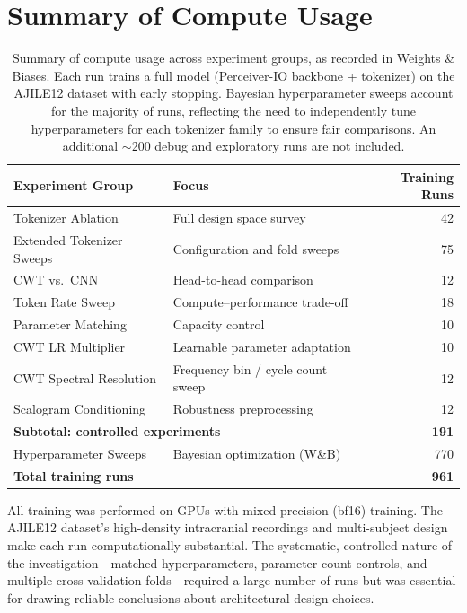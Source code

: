 \documentclass[11pt, a4paper]{article}
\begin{document}
\section{Summary of Compute Usage}
\label{sec:compute}

\begin{table}[H]
    \centering
    \begin{tabular}{llr}
        \toprule
        \textbf{Experiment Group} & \textbf{Focus} & \textbf{Training Runs} \\
        \midrule
        Tokenizer Ablation        & Full design space survey           & 42 \\
        Extended Tokenizer Sweeps & Configuration and fold sweeps      & 75 \\
        CWT vs.\ CNN              & Head-to-head comparison            & 12 \\
        Token Rate Sweep          & Compute--performance trade-off     & 18 \\
        Parameter Matching        & Capacity control                   & 10 \\
        CWT LR Multiplier         & Learnable parameter adaptation     & 10 \\
        CWT Spectral Resolution   & Frequency bin / cycle count sweep  & 12 \\
        Scalogram Conditioning    & Robustness preprocessing           & 12 \\
        \midrule
        \multicolumn{2}{l}{\textbf{Subtotal: controlled experiments}} & \textbf{191} \\
        \midrule
        Hyperparameter Sweeps     & Bayesian optimization (W\&B)       & 770 \\
        \midrule
        \multicolumn{2}{l}{\textbf{Total training runs}} & \textbf{961} \\
        \bottomrule
    \end{tabular}
    \caption{Summary of compute usage across experiment groups, as recorded in Weights \& Biases.  Each run trains a full model (Perceiver-IO backbone + tokenizer) on the AJILE12 dataset with early stopping.  Bayesian hyperparameter sweeps account for the majority of runs, reflecting the need to independently tune hyperparameters for each tokenizer family to ensure fair comparisons.  An additional $\sim$200 debug and exploratory runs are not included.}
    \label{tab:compute}
\end{table}

All training was performed on GPUs with mixed-precision (bf16) training.  The AJILE12 dataset's high-density intracranial recordings and multi-subject design make each run computationally substantial.  The systematic, controlled nature of the investigation---matched hyperparameters, parameter-count controls, and multiple cross-validation folds---required a large number of runs but was essential for drawing reliable conclusions about architectural design choices.




\end{document}
